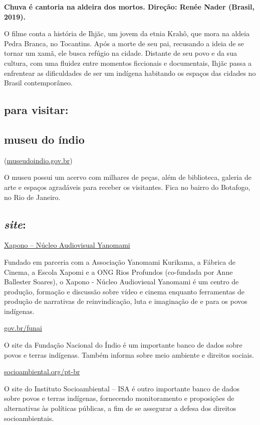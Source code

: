 \documentclass[12pt]{extarticle}
\begin{document}
\textbf{Chuva é cantoria na aldeira dos mortos. Direção: Renée Nader (Brasil, 2019).}

O filme conta a história de Ihjãc, um jovem da etnia Krahô, que mora na aldeia Pedra 
Branca, no Tocantins. Após a morte de seu pai, recusando a ideia de se tornar um xamã, 
ele busca refúgio na cidade. Distante de seu povo e da sua cultura, com uma fluidez 
entre momentos ficcionais e documentais, Ihjãc passa a enfrentear as dificuldades de 
ser um indígena habitando os espaços das cidades no Brasil contemporâneo.

\subsection{para visitar: }\subsection{museu do índio}
(\href{http://www.museudoindio.gov.br/}{{museudoindio.gov.br}})

O museu possui um acervo com milhares de peças, além de biblioteca,
galeria de arte e espaços agradáveis para receber os visitantes. Fica no
bairro do Botafogo, no Rio de Janeiro.

\subsection{\emph{site}:}

\href{https://vimeo.com/xapono?fbclid=IwAR2dao6qx16C1AwtQMf4HGTWCCsQ7ItIUtpq1R8ZiNB4EACiVNuJ-mp_gu8}{Xapono – Núcleo Audiovisual Yanomami}

Fundado em parceria com a Associação Yanomami Kurikama, a Fábrica de 
Cinema, a Escola Xapomi e a ONG Rios Profundos (co-fundada por Anne 
Ballester Soares), o Xapono - Núcleo Audiovisual Yanomami é um centro 
de produção, formação e discussão sobre vídeo e cinema enquanto 
ferramentas de produção de narrativas de reinvindicação, luta e 
imaginação de e para os povos indígenas.

\href{http://www.gov.br/funai}{{gov.br/funai}}

O site da Fundação Nacional do Índio é um importante banco de dados
sobre povos e terras indígenas. Também informa sobre meio ambiente e
direitos sociais.

\href{https://www.socioambiental.org/pt-br}{{socioambiental.org/pt-br}}

O site do Instituto Socioambiental – ISA é outro importante banco de dados 
sobre povos e terras indígenas, fornecendo monitoramento e proposições de 
alternativas às políticas públicas, a fim de se assegurar a defesa dos direitos
socioambientais. 
\end{document}

